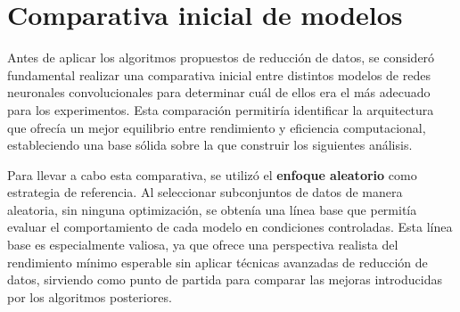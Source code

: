 \section{Comparativa inicial de modelos}\label{sec:comparativa-inicial-modelos}
Antes de aplicar los algoritmos propuestos de reducción de datos, se consideró fundamental realizar una comparativa inicial entre distintos modelos de redes neuronales convolucionales para determinar cuál de ellos era el más adecuado para los experimentos.
Esta comparación permitiría identificar la arquitectura que ofrecía un mejor equilibrio entre rendimiento y eficiencia computacional, estableciendo una base sólida sobre la que construir los siguientes análisis.

Para llevar a cabo esta comparativa, se utilizó el \textbf{enfoque aleatorio} como estrategia de referencia.
Al seleccionar subconjuntos de datos de manera aleatoria, sin ninguna optimización, se obtenía una línea base que permitía evaluar el comportamiento de cada modelo en condiciones controladas.
Esta línea base es especialmente valiosa, ya que ofrece una perspectiva realista del rendimiento mínimo esperable sin aplicar técnicas avanzadas de reducción de datos, sirviendo como punto de partida para comparar las mejoras introducidas por los algoritmos posteriores.


